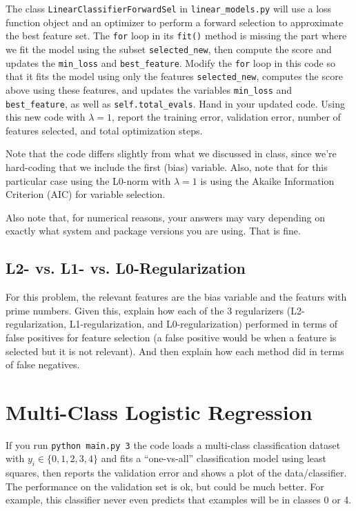 \documentclass{article}
\def\blu#1{{\color{blu}#1}}
\let\ask\blu
\begin{document}
The class \verb|LinearClassifierForwardSel| in \verb|linear_models.py| will use a loss function object and an optimizer to perform a forward selection to approximate the best feature set.
The \verb|for| loop in its \verb|fit()| method is missing the part where we fit the model using the subset \verb|selected_new|,
then compute the score and updates the \verb|min_loss| and \verb|best_feature|.
Modify the \verb|for| loop in this code so that it fits the model using only
the features \verb|selected_new|, computes the score above using these features,
and updates the variables \verb|min_loss| and \verb|best_feature|,
as well as \verb|self.total_evals|.
\ask{Hand in your updated code. Using this new code with $\lambda=1$,
report the training error, validation error, number of features selected, and total optimization steps.}

Note that the code differs slightly from what we discussed in class,
since we're hard-coding that we include the first (bias) variable.
Also, note that for this particular case using the L0-norm with $\lambda=1$
is using the Akaike Information Criterion (AIC) for variable selection.

Also note that, for numerical reasons, your answers may vary depending on exactly what system and package versions you are using. That is fine.

\pagebreak

\subsection{L2- vs. L1- vs. L0-Regularization}

For this problem, the relevant features are the bias variable and the featurs with prime numbers. Given this, \blu{explain how each of the 3 regularizers (L2-regularization, L1-regularization, and L0-regularization) performed in terms of false positives for feature selection (a false positive would be when a feature is selected but it is not relevant). And then explain how each method did in terms of false negatives.}

\pagebreak


\section{Multi-Class Logistic Regression}

If you run \verb|python main.py 3| the code loads a multi-class
classification dataset with $y_i \in \{0,1,2,3,4\}$ and fits a ``one-vs-all'' classification
model using least squares, then reports the validation error and shows a plot of the data/classifier.
The performance on the validation set is ok, but could be much better.
For example, this classifier never even predicts that examples will be in classes 0 or 4.
\end{document}
